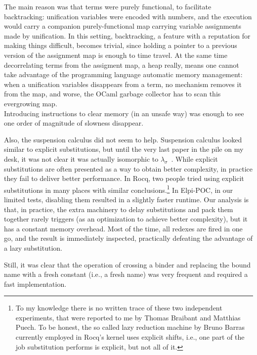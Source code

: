 \documentclass{these-ISSS}
\begin{document}
The main reason was that
terms were purely functional, to facilitate backtracking: unification
variables were encoded with numbers, and the execution would carry a
companion purely-functional map carrying variable assignments made by unification.
In this setting, backtracking, a feature with a
reputation for making things difficult, becomes trivial, since 
holding a pointer to a previous version of the assignment map is
enough to time travel. At the same time decorrelating terms from
the assigment map, a heap really, means one cannot take advantage of
the programming language automatic memory management: when a unification
variables disappears from a term, no mechanism removes it from the map,
and worse, the OCaml garbage collector has to scan this evergrowing
map.\\
Introducing instructions to clear memory (in an unsafe way) was enough to see
one order of magnitude of slowness disappear.


Also, the suspension calculus did not seem to help. Suspension calculus looked
similar to explicit substitutions, but until the very last paper in the pile on
my desk, it was not clear it was actually isomorphic to
$\lambda_\sigma$~\cite{expsubst}. While explicit substitutions are often
presented as a way to obtain better complexity, in practice they fail to
deliver better performance. In Rocq, two people tried using explicit
substitutions in many places with similar conclusions.\footnote{To my knowledge
there is
no written trace of these two independent experiments, that were reported to me by
Thomas Braibant and Matthias Puech. To be honest, the so called lazy
reduction machine by Bruno Barras currently employed in Rocq's kernel
uses explicit shifts, i.e., one part of the job substitution performs
is explicit, but not all of it.} In Elpi-POC, in our
limited tests, disabling them resulted in a slightly faster runtime. Our analysis is
that, in practice, the extra machinery to delay substitutions and pack them
together rarely triggers (as an optimization to achieve better complexity), but
it has a constant memory overhead. Most of the time, all redexes are fired in
one go, and the result is immediately inspected, practically defeating
the advantage of a lazy substitution.

Still, it was clear that the operation of crossing a binder and replacing the
bound name with a fresh constant (i.e., a fresh name) was very frequent and
required a fast implementation.

\newcommand{\theotherfragment}{\ensuremath{L_{\lambda}}\xspace}
\newcommand{\thefragment}{\ensuremath{L_{\lambda}^{\beta}}\xspace}
\newtheorem{definition}{Definition}
\end{document}

